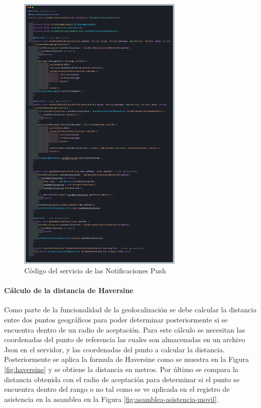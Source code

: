 \begin{figure}[H]
    \centering
    \includegraphics[width=0.7\textwidth]{resources/images/pushNotification}
    \caption{Código del servicio de las Notificaciones Push}
    \label{fig:pushNotification-service}
\end{figure}

\paragraph{Cálculo de la distancia de Haversine}

Como parte de la funcionalidad de la geolocalización se debe calcular la distancia entre dos puntos geográficos para poder determinar posteriormente si se encuentra dentro de un radio de aceptación.
Para este cálculo se necesitan las coordenadas del punto de referencia las cuales son almacenadas en un archivo Json en el servidor, y las coordenadas del punto a calcular la distancia.
Posteriormente se aplica la formula de Haversine como se muestra en la Figura \ref{fig:haversine} y se obtiene la distancia en metros.
Por último se compara la distancia obtenida con el radio de aceptación para determinar si el punto se encuentra dentro del rango o no tal como se ve aplicada en el registro de asistencia en la asamblea en la Figura \ref{fig:asamblea-asistencia-movil}.

